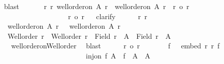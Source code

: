 \begin{isabellebody}
\ blast\isanewline
\ \ \isamarkupfalse%
\isanewline
\ \ \isamarkupfalse%
\ {\isachardoublequoteopen}{\isasymforall}r\ r{\isacharprime}{\kern0pt}{\isachardot}{\kern0pt}\ well{\isacharunderscore}{\kern0pt}order{\isacharunderscore}{\kern0pt}on\ A\ r\ {\isasymand}\ well{\isacharunderscore}{\kern0pt}order{\isacharunderscore}{\kern0pt}on\ A\ r{\isacharprime}{\kern0pt}\ {\isasymand}\ r\ {\isasymle}o\ r{\isacharprime}{\kern0pt}\isanewline
\ \ \ \ \ \ \ \ \ \ \ \ \ \ \ \ \ \ {\isasymlongrightarrow}\ r\ {\isacharequal}{\kern0pt}o\ r{\isacharprime}{\kern0pt}{\isachardoublequoteclose}\isanewline
\ \ \isamarkupfalse%
{\isacharparenleft}{\kern0pt}clarify{\isacharparenright}{\kern0pt}\isanewline
\ \ \ \ \isamarkupfalse%
\ r\ r{\isacharprime}{\kern0pt}\ \isamarkupfalse%
\ {\isacharasterisk}{\kern0pt}{\isacharcolon}{\kern0pt}\ {\isachardoublequoteopen}well{\isacharunderscore}{\kern0pt}order{\isacharunderscore}{\kern0pt}on\ A\ r{\isachardoublequoteclose}\ \ {\isacharasterisk}{\kern0pt}{\isacharasterisk}{\kern0pt}{\isacharcolon}{\kern0pt}\ {\isachardoublequoteopen}well{\isacharunderscore}{\kern0pt}order{\isacharunderscore}{\kern0pt}on\ A\ r{\isacharprime}{\kern0pt}{\isachardoublequoteclose}\isanewline
\ \ \ \ \isamarkupfalse%
\ {}{\isacharcolon}{\kern0pt}\ {\isachardoublequoteopen}Well{\isacharunderscore}{\kern0pt}order\ r\ {\isasymand}\ Well{\isacharunderscore}{\kern0pt}order\ r{\isacharprime}{\kern0pt}\ {\isasymand}\ Field\ r\ {\isacharequal}{\kern0pt}\ A\ {\isasymand}\ Field\ r{\isacharprime}{\kern0pt}\ {\isacharequal}{\kern0pt}\ A{\isachardoublequoteclose}\isanewline
\ \ \ \ \isamarkupfalse%
\ {\isacharasterisk}{\kern0pt}\ {\isacharasterisk}{\kern0pt}{\isacharasterisk}{\kern0pt}\ well{\isacharunderscore}{\kern0pt}order{\isacharunderscore}{\kern0pt}on{\isacharunderscore}{\kern0pt}Well{\isacharunderscore}{\kern0pt}order\ \isamarkupfalse%
\ blast\isanewline
\ \ \ \ \isamarkupfalse%
\ {\isachardoublequoteopen}r\ {\isasymle}o\ r{\isacharprime}{\kern0pt}{\isachardoublequoteclose}\isanewline
\ \ \ \ \isamarkupfalse%
\ \isamarkupfalse%
\ f\ \ {}{\isacharcolon}{\kern0pt}\ {\isachardoublequoteopen}embed\ r\ r{\isacharprime}{\kern0pt}\ f{\isachardoublequoteclose}\ \isanewline
\ \ \ \ \ \ \ \ \ \ \ \ \ \ \ \ \ \ \ \ \ \ \ \ {\isachardoublequoteopen}inj{\isacharunderscore}{\kern0pt}on\ f\ A\ {\isasymand}\ f\ {\isacharbackquote}{\kern0pt}\ A\ {\isasymle}\ A{\isachardoublequoteclose}\isanewline

\end{isabellebody}
